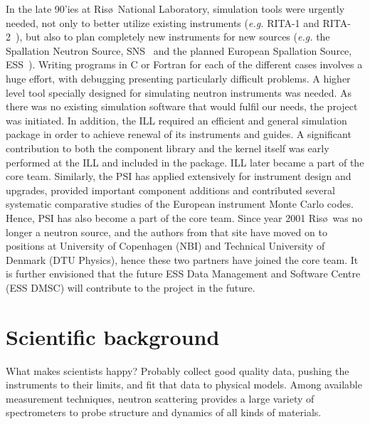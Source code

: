 In the late 90'ies at Ris\o\ National Laboratory,
simulation tools were urgently needed,
not only to better utilize existing instruments
({\em e.g.} RITA-1 and RITA-2~\cite{cjp_73_697,pb_241_50,pb_283_343}),
but also to plan completely new instruments for new sources
({\em e.g.} the Spallation Neutron Source, SNS~\cite{sns_webpage}
and the planned European Spallation Source, ESS~\cite{ess_webpage}).
Writing programs in C or Fortran for
each of the different cases involves a huge effort, with debugging presenting
particularly difficult problems. A higher level tool specially designed
for simulating neutron instruments was needed. As there was
no existing simulation software that would fulfil our needs, the \MCS
project was initiated.
In addition, the ILL required an efficient and general simulation
package in order to achieve renewal of its instruments and guides.
A significant contribution to both the component library and the \MCS
kernel itself was early performed at the ILL and included in the package.
ILL later became a part of the core \MCS team.
Similarly, the PSI has applied \MCS extensively for instrument design
and upgrades, provided important component additions and contributed
several systematic comparative studies of the European instrument
Monte Carlo codes. Hence, PSI has also become a part of the core \MCS
team.
Since year 2001 Ris\o\ was no longer a neutron source, and the authors
from that site have moved on to positions at University of Copenhagen
(NBI) and Technical University of Denmark (DTU Physics), hence these
two partners have joined the core \MCS team.
It is further envisioned that the future ESS Data Management and
Software Centre (ESS DMSC) will contribute to the project in the future.

\section{Scientific background}
What makes scientists happy? Probably collect good quality data, pushing the instruments to their limits, and fit that data to physical models.
Among available measurement techniques, neutron scattering provides a
large variety of spectrometers to probe structure and dynamics of all
kinds of materials.


